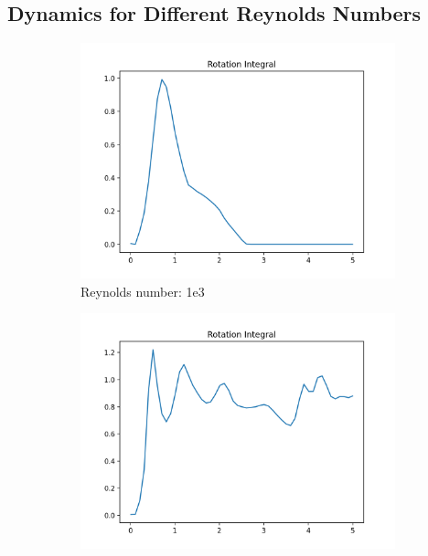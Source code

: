 \documentclass[a4paper,12pt]{article}
\begin{document}
\subsection{Dynamics for Different Reynolds Numbers}
\label{sec:result_reynolds}
\begin{figure}
     \centering
     \begin{subfigure}[b]{0.45\textwidth}
         \centering
         \includegraphics[width=\textwidth]{imgs/results-KHI-RE1000.0-RSL64-rr_integral}
         \caption{Reynolds number: 1e3}
         \label{fig:re1000-rs64}
     \end{subfigure}
     \hfill
     \begin{subfigure}[b]{0.45\textwidth}
         \centering
         \includegraphics[width=\textwidth]{imgs/results-KHI-RE10000.0-RSL64-rr_integral}

\end{subfigure}
\end{figure}
\end{document}
